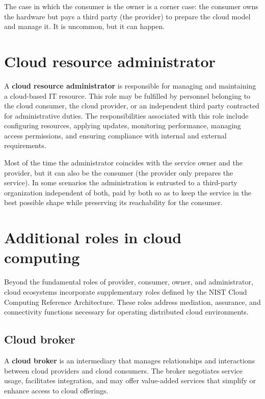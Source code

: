 The case in which the consumer is the owner is a corner case: the consumer owns the hardware but pays a third party (the provider) to prepare the cloud model and manage it. It is uncommon, but it can happen.

\begin{center}
\end{center}

\section{Cloud resource administrator}

A \textbf{cloud resource administrator} is responsible for managing and maintaining a cloud-based IT resource. This role may be fulfilled by personnel belonging to the cloud consumer, the cloud provider, or an independent third party contracted for administrative duties. The responsibilities associated with this role include configuring resources, applying updates, monitoring performance, managing access permissions, and ensuring compliance with internal and external requirements.

Most of the time the administrator coincides with the service owner and the provider, but it can also be the consumer (the provider only prepares the service). In some scenarios the administration is entrusted to a third-party organization independent of both, paid by both so as to keep the service in the best possible shape while preserving its reachability for the consumer.

\section{Additional roles in cloud computing}

Beyond the fundamental roles of provider, consumer, owner, and administrator, cloud ecosystems incorporate supplementary roles defined by the NIST Cloud Computing Reference Architecture. These roles address mediation, assurance, and connectivity functions necessary for operating distributed cloud environments.

\subsection{Cloud broker}

A \textbf{cloud broker} is an intermediary that manages relationships and interactions between cloud providers and cloud consumers. The broker negotiates service usage, facilitates integration, and may offer value-added services that simplify or enhance access to cloud offerings.

